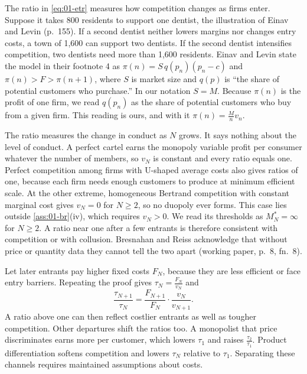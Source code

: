 The ratio in \eqref{eq:01-etr} measures how competition changes as firms enter. Suppose it takes 800 residents
to support one dentist, the illustration of Einav and Levin (p.~155). If a second dentist neither lowers
margins nor changes entry costs, a town of 1,600 can support two dentists. If the second dentist intensifies
competition, two dentists need more than 1,600 residents. Einav and Levin state the model in their footnote
4 as $\pi(n) = S\,q(p_n)(p_n - c)$ and $\pi(n) > F > \pi(n + 1)$, where $S$ is market size and $q(p)$ is
``the share of potential customers who purchase.'' In our notation $S = M$. Because $\pi(n)$ is the profit of
one firm, we read $q(p_n)$ as the share of potential customers who buy from a given firm. This reading is ours,
and with it $\pi(n) = \frac{M}{n}v_n$.

\begin{remark}\label{rem:01-etr-meaning}
The ratio measures the change in conduct as $N$ grows. It says nothing about the level of conduct. A perfect
cartel earns the monopoly variable profit per consumer whatever the number of members, so $v_N$ is constant
and every ratio equals one. Perfect competition among firms with U-shaped average costs also gives ratios of
one, because each firm needs enough customers to produce at minimum efficient scale. At the other extreme,
homogeneous Bertrand competition with constant marginal cost gives $v_N = 0$ for $N \ge 2$, so no duopoly
ever forms. This case lies outside \cref{ass:01-br}(iv), which requires $v_N > 0$. We read its thresholds as
$M_N^* = \infty$ for $N \ge 2$. A ratio near one after a few entrants is therefore consistent with competition or with collusion.
Bresnahan and Reiss acknowledge that without price or quantity data they cannot tell the two apart (working
paper, p.~8, fn.~8).
\end{remark}

\begin{remark}\label{rem:01-etr-costs}
Let later entrants pay higher fixed costs $F_N$, because they are less efficient or face entry barriers.
Repeating the proof gives $\tau_N = \frac{F_N}{v_N}$ and
\[
  \frac{\tau_{N+1}}{\tau_N} = \frac{F_{N+1}}{F_N}\cdot\frac{v_N}{v_{N+1}} .
\]
A ratio above one can then reflect costlier entrants as well as tougher competition. Other departures shift the
ratios too. A monopolist that price discriminates earns more per customer, which lowers $\tau_1$ and raises
$\frac{\tau_2}{\tau_1}$. Product differentiation softens competition and lowers $\tau_N$ relative to $\tau_1$.
Separating these channels requires maintained assumptions about costs.
\end{remark}

